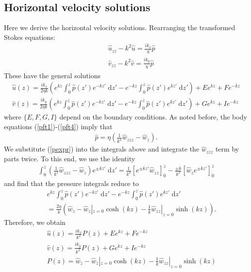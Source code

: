 \documentclass[paper=a4, fontsize=11pt]{article} %
\begin{document}
\subsection{Horizontal velocity solutions}
Here we derive the horizontal velocity solutions.
Rearranging the transformed Stokes equations:
\begin{eqnarray}
  &&  \widehat{u}_{zz}-k^2\widehat{u} = \frac{ik_x}{\eta}\widehat{p} \\
  &&  \widehat{v}_{zz}-k^2\widehat{v} = \frac{ik_y}{\eta}\widehat{p}
\end{eqnarray}
These have the general solutions
\begin{eqnarray}
\widehat{u}(z) = \frac{ik_x }{2\eta k} \left(e^{kz}\int_0^z \widehat{p}(z')e^{-kz'}\;\mathrm{d}z' -
e^{-kz}\int_0^z \widehat{p}(z')e^{kz'}\;\mathrm{d}z'\right)
+ E e^{kz} + F e^{-kz} \\
\widehat{v}(z) = \frac{ik_y }{2\eta k} \left(e^{kz}\int_0^z \widehat{p}(z')e^{-kz'}\;\mathrm{d}z' -
e^{-kz}\int_0^z \widehat{p}(z')e^{kz'}\;\mathrm{d}z'\right)
+ G e^{kz} + I e^{-kz}
\end{eqnarray}
where $\{E,F,G,I\}$ depend on the boundary conditions.
As noted before, the body equations (\ref{pft1})-(\ref{pft4}) imply that
\begin{eqnarray}
\widehat{p} = \eta\left(\frac{1}{k^2}\widehat{w}_{zzz}-\widehat{w}_z \right). \label{pexpr}
\end{eqnarray}
We substitute (\ref{pexpr}) into the integrals above
and integrate the $\widehat{w}_{zzz}$ term by parts twice.
To this end, we use the identity
\begin{eqnarray}
\int_0^z \left( \frac{1}{k^2} \widehat{w}_{zzz} - \widehat{w}_{z}\right) e^{\pm kz'}\;\mathrm{d}z'
= \frac{1}{k^2} \left[e^{\pm kz'}\widehat{w}_{zz}\right]_0^z - \frac{\pm k}{k^2}\left[\widehat{w}_ze^{\pm kz'} \right]_0^z
\end{eqnarray}
and find that the pressure integrals reduce to
\begin{eqnarray}
&&e^{kz}\int_0^z \widehat{p}(z')e^{-kz'}\;\mathrm{d}z' -
  e^{-kz}\int_0^z \widehat{p}(z')e^{kz'}\;\mathrm{d}z' \nonumber
  \\ &&= \frac{2\eta}{k} \left( \widehat{w}_z-\widehat{w}_z|_{z=0}\cosh(kz) - \frac{1}{k} \widehat{w}_{zz}|_{z=0}\sinh(kz)  \right).
\end{eqnarray}
Therefore, we obtain
\begin{eqnarray}
&&\widehat{u}(z) = \frac{ik_x }{k^2} P(z)
+ E e^{kz} + F e^{-kz} \label{uexpr}\\
&&\widehat{v}(z) = \frac{ik_y }{k^2} P(z) + G e^{kz} + I e^{-kz} \label{vexpr} \\
&&P(z) = \widehat{w}_z-\widehat{w}_z|_{z=0}\cosh(kz) - \frac{1}{k} \widehat{w}_{zz}|_{z=0}\sinh(kz)
\end{eqnarray}
\end{document}
